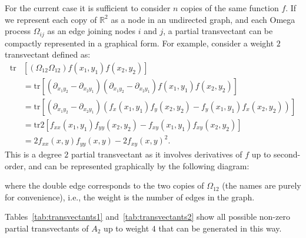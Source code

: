 \documentclass{artjlt}
\begin{document}
For the current case it is sufficient to consider $n$ copies of the same
function $f$. If we represent each copy of $\mathbb{R}^2$ as a node in an
undirected graph, and each Omega process $\Omega_{ij}$ as an edge joining
nodes $i$ and $j$, a partial transvectant can be compactly represented in a
graphical form. For example, consider a weight $2$ transvectant defined as:
\begin{align*}
    \mbox{tr} &\left[(\Omega_{12}\Omega_{12}) f(x_1, y_1)f(x_2, y_2)\right] \\
    &= \mbox{tr}\left[(\partial_{x_1 y_2} - \partial_{x_2y_1})(\partial_{x_1 y_2} -
    \partial_{x_2y_1})f(x_1, y_1)f(x_2, y_2)\right]\\
    &= \mbox{tr}\left[\left(\partial_{x_1 y_2} - \partial_{x_2 y_1}\right)\left(f_x(x_1, y_1)f_y(x_2, y_2) - f_y(x_1, y_1)f_x(x_2, y_2)\right)\right] \\
    &= \mbox{tr} 2 \left[f_{xx}(x_1, y_1)f_{yy}(x_2, y_2) - f_{xy}(x_1, y_1)f_{xy}(x_2, y_2)\right] \\
    &= 2 f_{xx}(x, y) f_{yy}(x, y) - 2 f_{xy}(x, y)^2.
\end{align*}
This is a degree $2$ partial transvectant as it involves derivatives of $f$
up to second-order, and can be represented graphically by the following
diagram:
\begin{center}
\end{center}
where the double edge corresponds to the two copies of $\Omega_{12}$ (the names are purely for convenience), i.e.,
the weight is the number of edges in the graph.

Tables~\ref{tab:transvectants1} and~\ref{tab:transvectants2} show all possible non-zero partial
transvectants of $A_2$ up to weight $4$ that can be generated in this way.
\end{document}
